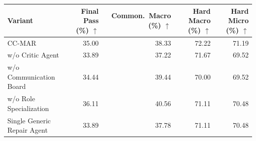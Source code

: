 \begin{tabular}{@{}lrrrr@{}}
\toprule
Variant & Final Pass (\%) $\uparrow$ & Common.\ Macro (\%) $\uparrow$ & Hard Macro (\%) $\uparrow$ & Hard Micro (\%) $\uparrow$ \\
\midrule
CC-MAR & 35.00 & 38.33 & 72.22 & 71.19 \\
w/o Critic Agent & 33.89 & 37.22 & 71.67 & 69.52 \\
w/o Communication Board & 34.44 & 39.44 & 70.00 & 69.52 \\
w/o Role Specialization & 36.11 & 40.56 & 71.11 & 70.48 \\
Single Generic Repair Agent & 33.89 & 37.78 & 71.11 & 70.48 \\
\bottomrule
\end{tabular}
